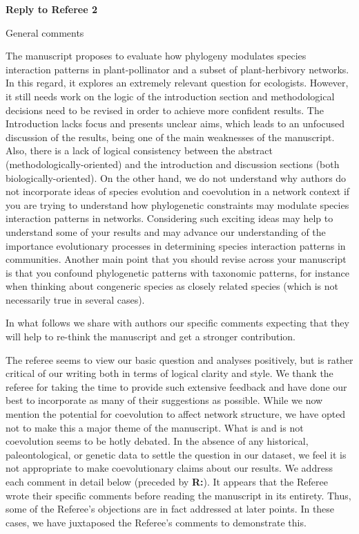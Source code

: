 \documentclass[12pt]{letter}
\newenvironment{refquote}{\bigskip \begin{it}}{\end{it}\smallskip}
\begin{document}
\clearpage

{\Large \bf Reply to Referee 2}


	\begin{refquote}
	General comments

	The manuscript proposes to evaluate how phylogeny modulates species interaction patterns in plant-pollinator and a subset of plant-herbivory networks. In this regard, it explores an extremely relevant question for ecologists. However, it still needs work on the logic of the introduction section and methodological decisions need to be revised in order to achieve more confident results. The Introduction lacks focus and presents unclear aims, which leads to an unfocused discussion of the results, being one of the main weaknesses of the manuscript. Also, there is a lack of logical consistency between the abstract (methodologically-oriented) and the introduction and discussion sections (both biologically-oriented). On the other hand, we do not understand why authors do not incorporate ideas of species evolution and coevolution in a network context if you are trying to understand how phylogenetic constraints may modulate species interaction patterns in networks. Considering such exciting ideas may help to understand some of your results and may advance our understanding of  the importance evolutionary processes in determining species interaction patterns in communities.
	Another main point that you should revise across your manuscript is that you confound phylogenetic patterns with taxonomic patterns, for instance when thinking about congeneric species as closely related species (which is not necessarily true in several cases).

	\smallskip

	In what follows we share with authors our specific comments expecting that they will help to re-think the manuscript and get a stronger contribution.

	\end{refquote}


	The referee seems to view our basic question and analyses positively, but is rather critical of our  writing both in terms of logical clarity and style. We thank the referee for taking the time to provide such extensive feedback and have done our best to incorporate as many of their suggestions as possible. While we now mention the potential for coevolution to affect network structure, we have opted not to make this a major theme of the manuscript. What is and is not coevolution seems to be hotly debated. In the absence of any historical, paleontological, or genetic data to settle the question in our dataset, we feel it is not appropriate to make coevolutionary claims about our results. We address each comment in detail below (preceded by \textbf{R:}). It appears that the Referee wrote their specific comments before reading the manuscript in its entirety. Thus, some of the Referee's objections are in fact addressed at later points. In these cases, we have juxtaposed the Referee's comments to demonstrate this.
\end{document}
